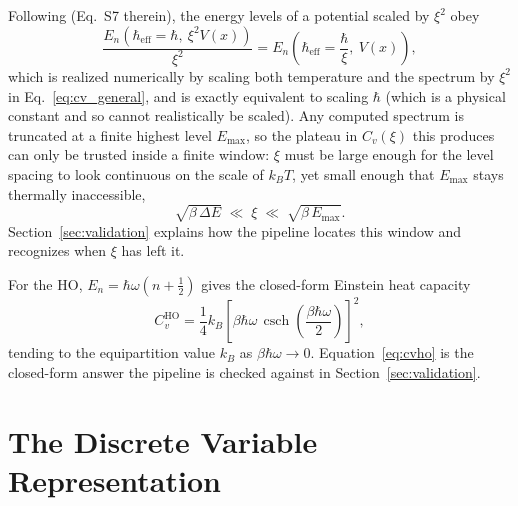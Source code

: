 \documentclass[10pt,conference]{IEEEtran}
\begin{document}
Following \cite{gelbwaser2018} (Eq.~S7 therein), the energy levels of a potential scaled by $\xi^2$ obey
\begin{equation}
\frac{E_n\!\left(\hbar_{\text{eff}}=\hbar,\ \xi^2 V(x)\right)}{\xi^2} = E_n\!\left(\hbar_{\text{eff}}=\frac{\hbar}{\xi},\ V(x)\right),
\label{eq:scaling}
\end{equation}
which is realized numerically by scaling both temperature and the spectrum by $\xi^2$ in Eq.~\eqref{eq:cv_general}, and is exactly equivalent to scaling $\hbar$ (which is a physical constant and so cannot realistically be scaled). Any computed spectrum is truncated at a finite highest level $E_{\max}$, so the plateau in $C_v(\xi)$ this produces can only be trusted inside a finite window: $\xi$ must be large enough for the level spacing to look continuous on the scale of $k_BT$, yet small enough that $E_{\max}$ stays thermally inaccessible,
\begin{equation}
\sqrt{\beta\,\Delta E} \;\ll\; \xi \;\ll\; \sqrt{\beta\,E_{\max}}.
\label{eq:xiwindow}
\end{equation}
Section~\ref{sec:validation} explains how the pipeline locates this window and recognizes when $\xi$ has left it.

For the HO, $E_n=\hbar\omega(n+\tfrac12)$ gives the closed-form Einstein heat capacity
\begin{equation}
C_v^{\text{HO}} = \frac{1}{4}k_B\left[\beta\hbar\omega\,\operatorname{csch}\!\left(\frac{\beta\hbar\omega}{2}\right)\right]^2 ,
\label{eq:cvho}
\end{equation}
tending to the equipartition value $k_B$ as $\beta\hbar\omega\to0$. Equation~\eqref{eq:cvho} is the closed-form answer the pipeline is checked against in Section~\ref{sec:validation}.

\section{The Discrete Variable Representation}
\label{sec:dvr}
\end{document}
